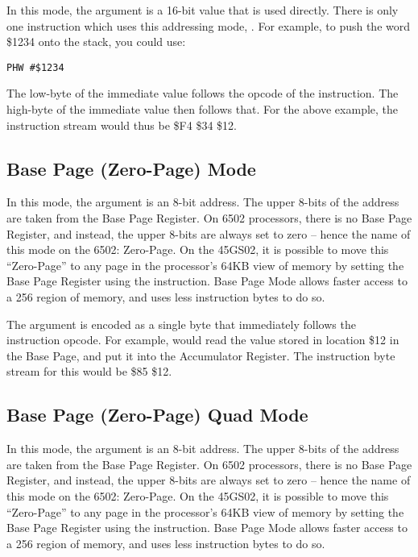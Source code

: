 In this mode, the argument is a 16-bit value that is used directly. There is only one instruction
which uses this addressing mode, .  For example, to push the word \$1234
onto the stack, you could use:

\begin{tcolorbox}[colback=black,coltext=white]
\verbatimfont{\codefont}
\begin{verbatim}
PHW #$1234
\end{verbatim}
\end{tcolorbox}

The low-byte of the immediate value follows the opcode of the instruction.  The high-byte of the
immediate value then follows that.  For the above example, the instruction stream would thus
be \$F4 \$34 \$12.

\subsection{Base Page (Zero-Page) Mode}

In this mode, the argument is an 8-bit address.  The upper 8-bits of the address are taken from
the Base Page Register.  On 6502 processors, there is no Base Page Register, and instead, the
upper 8-bits are always set to zero -- hence the name of this mode on the 6502: Zero-Page. On
the 45GS02, it is possible to move this ``Zero-Page'' to any page in the processor's 64KB view
of memory by setting the Base Page Register using the  instruction. Base Page
Mode allows faster access to a 256 region of memory, and uses less instruction bytes to do so.

The argument is encoded as a single byte that immediately follows the instruction opcode. For
example,  would read the value stored in location \$12 in the Base Page,
and put it into the Accumulator Register.  The instruction byte stream for this would be
\$85 \$12.

\subsection{Base Page (Zero-Page) Quad Mode}

In this mode, the argument is an 8-bit address.  The upper 8-bits of the address are taken from
the Base Page Register.  On 6502 processors, there is no Base Page Register, and instead, the
upper 8-bits are always set to zero -- hence the name of this mode on the 6502: Zero-Page. On
the 45GS02, it is possible to move this ``Zero-Page'' to any page in the processor's 64KB view
of memory by setting the Base Page Register using the  instruction. Base Page
Mode allows faster access to a 256 region of memory, and uses less instruction bytes to do so.

